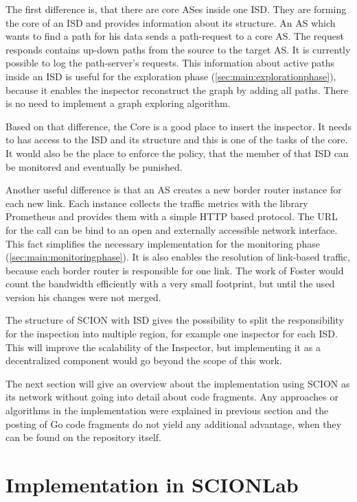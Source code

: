 \documentclass[thesis.tex]{subfiles}
\begin{document}
The first difference is, that there are core ASes inside one ISD. They are forming the core of an ISD and provides information about its structure. An AS which wants to find a path for his data sends a path-request to a core AS. The request responds contains up-down paths  from the source to the target AS. It is currently possible to log the path-server's requests. This information about active paths inside an ISD is useful for the exploration phase (\autoref{sec:main:explorationphase}), because it enables the inspector reconstruct the graph by adding all paths. There is no need to implement a graph exploring algorithm.

Based on that difference, the Core is a good place to insert the inspector. It needs to has access to the ISD and its structure and this is one of the tasks of the core. It would also be the place to enforce the policy, that the member of that ISD can be monitored and eventually be punished. 

Another useful difference is that an AS creates a new border router instance for each new link. Each instance collects the traffic metrics with the library Prometheus and provides them with a simple HTTP based protocol. The URL for the call can be bind to an open and externally accessible network interface. This fact simplifies the necessary implementation for the monitoring phase (\autoref{sec:main:monitoringphase}). It is also enables the resolution of link-based traffic, because each border router is responsible for one link. The work of Foster\cite{Forster.September2017} would count the bandwidth efficiently with a very small footprint, but until the used version his changes were not merged. 

The structure of SCION with ISD gives the possibility to split the responsibility for the inspection into multiple region, for example one inspector for each ISD. This will improve the scalability of the Inspector, but implementing it as a decentralized component would go beyond the scope of this work.

The next section will give an overview about the implementation using SCION as its network without going into detail about code fragments. Any approaches or algorithms in the implementation were explained in previous section and the posting of Go code fragments do not yield any additional advantage, when they can be found on the repository itself.

\section{Implementation in SCIONLab} \label{sec:main:scionlabimpl}
\end{document}
